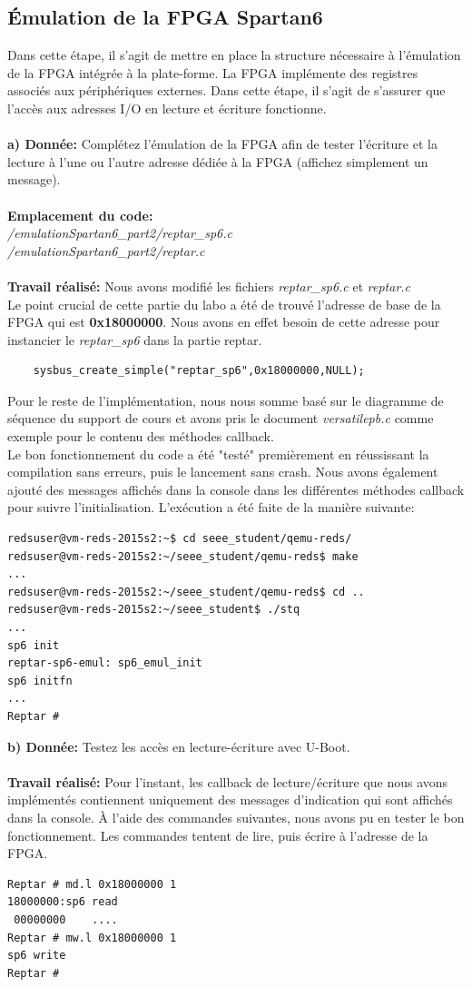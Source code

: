 \subsection{Émulation de la FPGA Spartan6}
Dans cette étape, il s'agit de mettre en place la structure nécessaire à l'émulation de la FPGA intégrée
à la plate-forme. La FPGA implémente des registres associés aux périphériques externes. Dans cette
étape, il s'agit de s'assurer que l'accès aux adresses I/O en lecture et écriture fonctionne. \\\\
\textbf{a) Donnée: }Complétez l'émulation de la FPGA afin de tester l'écriture et la lecture à l'une ou l'autre adresse
dédiée à la FPGA (affichez simplement un message). \\\\
\textbf{Emplacement du code:}\\\textit{/emulationSpartan6\_part2/reptar\_sp6.c}\\ \textit{/emulationSpartan6\_part2/reptar.c}\\\\
\textbf{Travail réalisé: }Nous avons modifié les fichiers \textit{reptar\_sp6.c} et \textit{reptar.c}\\
Le point crucial de cette partie du labo a été de trouvé l'adresse de base de la FPGA qui est \textbf{0x18000000}. Nous avons en effet besoin de cette adresse pour instancier le \textit{reptar\_sp6} dans la partie reptar. 
\begin{lstlisting}
	sysbus_create_simple("reptar_sp6",0x18000000,NULL);
\end{lstlisting}
Pour le reste de l'implémentation, nous nous somme basé sur le diagramme de séquence du support de cours et avons pris le document \textit{versatilepb.c} comme exemple pour le contenu des méthodes callback.\\
Le bon fonctionnement du code a été "testé" premièrement en réussissant la compilation sans erreurs, puis le lancement sans crash. Nous avons également ajouté des messages affichés dans la console dans les différentes méthodes callback pour suivre l'initialisation. L'exécution a été faite de la manière suivante:
\begin{lstlisting}
redsuser@vm-reds-2015s2:~$ cd seee_student/qemu-reds/
redsuser@vm-reds-2015s2:~/seee_student/qemu-reds$ make
...
redsuser@vm-reds-2015s2:~/seee_student/qemu-reds$ cd ..
redsuser@vm-reds-2015s2:~/seee_student$ ./stq
...
sp6 init
reptar-sp6-emul: sp6_emul_init
sp6 initfn
...
Reptar # 
\end{lstlisting}
\textbf{b) Donnée: }Testez les accès en lecture-écriture avec U-Boot. \\\\
\textbf{Travail réalisé: } Pour l'instant, les callback de lecture/écriture que nous avons implémentés contiennent uniquement des messages d'indication qui sont affichés dans la console. À l'aide des commandes suivantes, nous avons pu en tester le bon fonctionnement. Les commandes tentent de lire, puis écrire à l'adresse de la FPGA.
\begin{lstlisting}
Reptar # md.l 0x18000000 1
18000000:sp6 read
 00000000    ....
Reptar # mw.l 0x18000000 1
sp6 write
Reptar #
\end{lstlisting}
